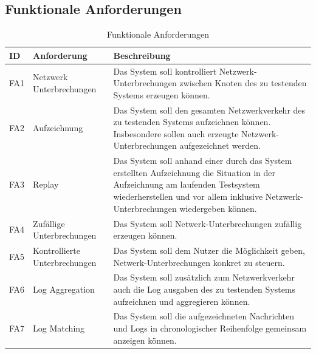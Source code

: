 \documentclass[12pt,a4paper]{report}
\begin{document}
\subsection{Funktionale Anforderungen}
\begin{table}[h]
	\centering
	\caption{Funktionale Anforderungen}
	\label{tab:fa}
	\begin{tabular}{|l|l|p{7cm}|}
		\hline
		ID   & Anforderung                   & Beschreibung                                                                                                                                                                                                          \\ \hline
		FA1  & Netzwerk Unterbrechungen      & Das System soll kontrolliert Netzwerk-Unterbrechungen zwischen Knoten des zu testenden Systems erzeugen können.                                                                                                       \\ \hline
		FA2  & Aufzeichnung                  & Das System soll den gesamten Netzwerkverkehr des zu testenden Systems aufzeichnen können. Insbesondere sollen auch erzeugte Netzwerk-Unterbrechungen aufgezeichnet werden.                                            \\ \hline
		FA3  & Replay                        & Das System soll anhand einer durch das System erstellten Aufzeichnung die Situation in der Aufzeichnung am laufenden Testsystem wiederherstellen und vor allem inklusive Netzwerk-Unterbrechungen wiedergeben können. \\ \hline
		FA4  & Zufällige Unterbrechungen     & Das System soll Netwerk-Unterbrechungen zufällig erzeugen können.                                                                                                                                                     \\ \hline
		FA5  & Kontrollierte Unterbrechungen & Das System soll dem Nutzer die Möglichkeit geben, Netwerk-Unterbrechungen konkret zu steuern.                                                                                                                         \\ \hline
		FA6  & Log Aggregation               & Das System soll zusätzlich zum Netzwerkverkehr auch die Log ausgaben des zu testenden Systems aufzeichnen und aggregieren können.                                                                                     \\ \hline
		FA7  & Log Matching                  & Das System soll die aufgezeichneten Nachrichten und Logs in chronologischer Reihenfolge gemeinsam anzeigen können.                                                                                                    \\ \hline

\end{tabular}
\end{table}
\end{document}
